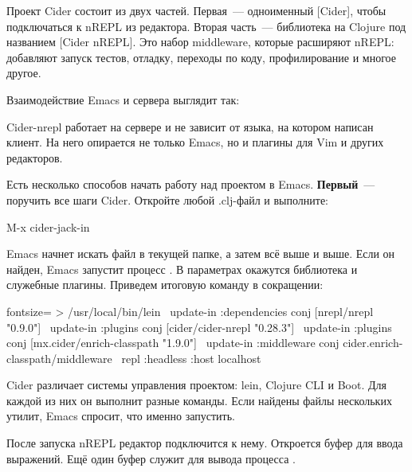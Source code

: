 Проект Cider состоит из двух частей. Первая~--- одноименный [Cider], чтобы подключаться к nREPL из редактора. Вторая часть~--- библиотека на Clojure под названием [Cider nREPL]. Это набор middleware, которые расширяют nREPL: добавляют запуск тестов, отладку, переходы по коду, профилирование и многое другое.

Взаимодействие Emacs и сервера выглядит так:

\begin{figure}[H]
  \centering
  
  \label{fig:chart-repl-01}
\end{figure}

Cider-nrepl работает на сервере и не зависит от языка, на котором написан клиент. На него опирается не только Emacs, но и плагины для Vim и других редакторов.

Есть несколько способов начать работу над проектом в Emacs. \textbf{Первый}~--- поручить все шаги Cider. Откройте любой .clj-файл и выполните:

\begin{english}
  \begin{text}
M-x cider-jack-in
  \end{text}
\end{english}

Emacs начнет искать файл  в текущей папке, а затем всё выше и выше. Если он найден, Emacs запустит процесс . В параметрах окажутся библиотека  и служебные плагины. Приведем итоговую команду в сокращении:

\begin{english}
  \begin{bash*}{fontsize=\small}
> /usr/local/bin/lein \
  update-in :dependencies conj [nrepl/nrepl "0.9.0"] \
  update-in :plugins conj [cider/cider-nrepl "0.28.3"] \
  update-in :plugins conj [mx.cider/enrich-classpath "1.9.0"] \
  update-in :middleware conj cider.enrich-classpath/middleware \
  repl :headless :host localhost
  \end{bash*}
\end{english}

Cider различает системы управления проектом: lein, Clojure CLI и Boot. Для каждой из них он выполнит разные команды. Если найдены файлы нескольких утилит, Emacs спросит, что именно запустить.

После запуска nREPL редактор подключится к нему. Откроется буфер  для ввода выражений. Ещё один буфер  служит для вывода процесса .

